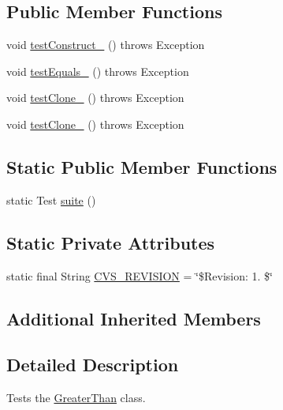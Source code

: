\subsection*{Public Member Functions}
\begin{DoxyCompactItemize}
\item 
void \hyperlink{classorg_1_1jgap_1_1gp_1_1function_1_1_greater_than_test_a7e4b781b972757736fa89e8cd391edea}{test\-Construct\-\_} ()  throws Exception 
\item 
void \hyperlink{classorg_1_1jgap_1_1gp_1_1function_1_1_greater_than_test_a376e562cedb5d2c6edafb3744a751519}{test\-Equals\-\_} ()  throws Exception 
\item 
void \hyperlink{classorg_1_1jgap_1_1gp_1_1function_1_1_greater_than_test_a0147185a80af880557e95232c778b849}{test\-Clone\-\_} ()  throws Exception 
\item 
void \hyperlink{classorg_1_1jgap_1_1gp_1_1function_1_1_greater_than_test_ac1d3ad2d005acfc2aee638e05acf6103}{test\-Clone\-\_} ()  throws Exception 
\end{DoxyCompactItemize}
\subsection*{Static Public Member Functions}
\begin{DoxyCompactItemize}
\item 
static Test \hyperlink{classorg_1_1jgap_1_1gp_1_1function_1_1_greater_than_test_aee13affa1770c375f9616cf20fed1e86}{suite} ()
\end{DoxyCompactItemize}
\subsection*{Static Private Attributes}
\begin{DoxyCompactItemize}
\item 
static final String \hyperlink{classorg_1_1jgap_1_1gp_1_1function_1_1_greater_than_test_a8fbd7beb85ab5b186f2687261e268dab}{C\-V\-S\-\_\-\-R\-E\-V\-I\-S\-I\-O\-N} = \char`\"{}\$Revision\-: 1. \$\char`\"{}
\end{DoxyCompactItemize}
\subsection*{Additional Inherited Members}


\subsection{Detailed Description}
Tests the \hyperlink{classorg_1_1jgap_1_1gp_1_1function_1_1_greater_than}{Greater\-Than} class.

